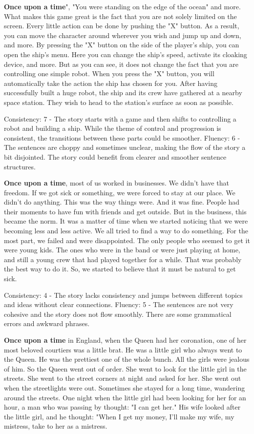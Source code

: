 \documentclass{article}
\begin{document}
\textbf{Once upon a time}", "You were standing on the edge of the ocean" and more. What makes this game great is the fact that you are not solely limited on the screen. Every little action can be done by pushing the "X" button. As a result, you can move the character around wherever you wish and jump up and down, and more. By pressing the "X" button on the side of the player's ship, you can open the ship's menu. Here you can change the ship's speed, activate its cloaking device, and more. But as you can see, it does not change the fact that you are controlling one simple robot. When you press the "X" button, you will automatically take the action the ship has chosen for you. After having successfully built a huge robot, the ship and its crew have gathered at a nearby space station. They wish to head to the station's surface as soon as possible.

Consistency: 7 - The story starts with a game and then shifts to controlling a robot and building a ship. While the theme of control and progression is consistent, the transitions between these parts could be smoother.
Fluency: 6 - The sentences are choppy and sometimes unclear, making the flow of the story a bit disjointed. The story could benefit from clearer and smoother sentence structures.

\textbf{Once upon a time}, most of us worked in businesses. We didn't have that freedom. If we got sick or something, we were forced to stay at our place. We didn't do anything. This was the way things were. And it was fine. People had their moments to have fun with friends and get outside. But in the business, this became the norm. It was a matter of time when we started noticing that we were becoming less and less active. We all tried to find a way to do something. For the most part, we failed and were disappointed. The only people who seemed to get it were young kids. The ones who were in the band or were just playing at home, and still a young crew that had played together for a while. That was probably the best way to do it. So, we started to believe that it must be natural to get sick.

Consistency: 4 - The story lacks consistency and jumps between different topics and ideas without clear connections.
Fluency: 5 - The sentences are not very cohesive and the story does not flow smoothly. There are some grammatical errors and awkward phrases.

\textbf{Once upon a time} in England, when the Queen had her coronation, one of her most beloved courtiers was a little brat. He was a little girl who always went to the Queen. He was the prettiest one of the whole bunch. All the girls were jealous of him. So the Queen went out of order. She went to look for the little girl in the streets. She went to the street corners at night and asked for her. She went out when the streetlights were out. Sometimes she stayed for a long time, wandering around the streets. One night when the little girl had been looking for her for an hour, a man who was passing by thought: "I can get her." His wife looked after the little girl, and he thought: "When I get my money, I'll make my wife, my mistress, take to her as a mistress.
\end{document}
